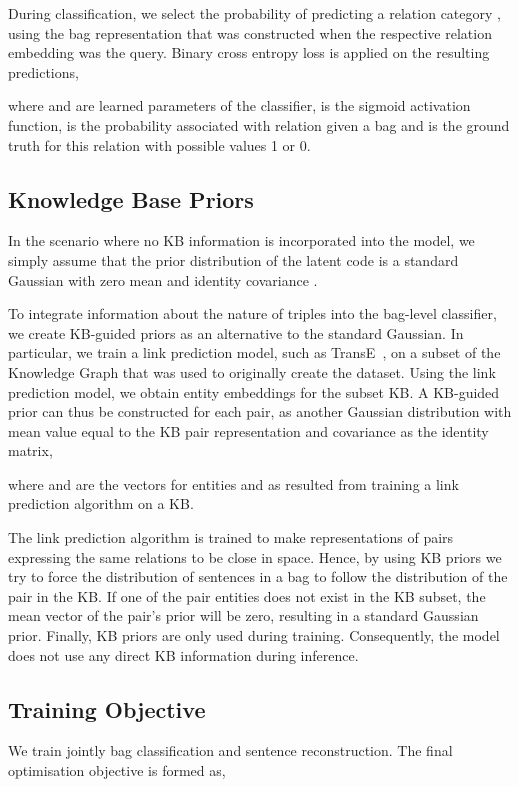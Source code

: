 \documentclass[11pt]{article}
\begin{document}
During classification, we select the probability of predicting a relation category , using the bag representation that was constructed when the respective relation embedding  was the query. 
Binary cross entropy loss is applied on the resulting predictions,

where  and  are learned parameters of the classifier,  is the sigmoid activation function,  is the probability associated with relation  given a bag  and  is the ground truth for this relation with possible values 1 or 0.



\subsection{Knowledge Base Priors}
In the scenario where no KB information is incorporated into the model, we simply assume that the prior distribution of the latent code  is a standard Gaussian with zero mean and identity covariance .

To integrate information about the nature of triples into the bag-level classifier, we create KB-guided priors as an alternative to the standard Gaussian. 
In particular, we train a link prediction model, such as TransE~\citep{bordes2013translating}, on a subset of the Knowledge Graph that was used to originally create the dataset. 
Using the link prediction model, we obtain entity embeddings for the subset KB.
A KB-guided prior can thus be constructed for each pair, as another Gaussian distribution with mean value equal to the KB pair representation and covariance as the identity matrix,

where  and  are the vectors for entities  and  as resulted from training a link prediction algorithm on a KB.

The link prediction algorithm is trained to make representations of pairs expressing the same relations to be close in space. 
Hence, by using KB priors we try to force the distribution of sentences in a bag to follow the distribution of the pair in the KB.
If one of the pair entities does not exist in the KB subset, the mean vector of the pair's prior will be zero, resulting in a standard Gaussian prior.
Finally, KB priors are only used during training. Consequently, the model does not use any direct KB information during inference.


\subsection{Training Objective}
We train jointly bag classification and sentence reconstruction. 
The final optimisation objective is formed as,
\end{document}
